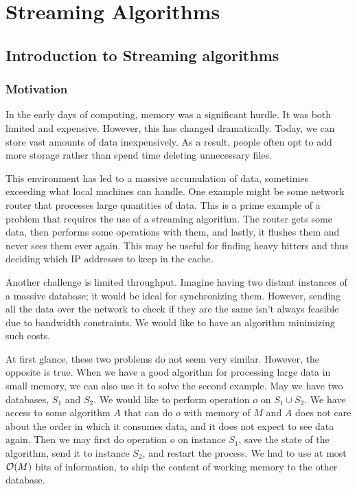 \chapter{Streaming Algorithms}

\section{Introduction to Streaming algorithms}

\subsection{Motivation}

In the early days of computing, memory was a significant hurdle. It was both limited and expensive. However, this has changed dramatically. Today, we can store vast amounts of data inexpensively. As a result, people often opt to add more storage rather than spend time deleting unnecessary files.

This environment has led to a massive accumulation of data, sometimes exceeding what local machines can handle. One example might be some network router that processes large quantities of data. This is a prime example of a problem that requires the use of a streaming algorithm. The router gets some data, then performs some operations with them, and lastly, it flushes them and never sees them ever again.  This may be useful for finding heavy hitters and thus deciding which IP addresses to keep in the cache.

Another challenge is limited throughput. Imagine having two distant instances of a massive database; it would be ideal for synchronizing them. However, sending all the data over the network to check if they are the same isn't always feasible due to bandwidth constraints. We would like to have an algorithm minimizing such costs. 

At first glance, these two problems do not seem very similar. However, the opposite is true. When we have a good algorithm for processing large data in small memory, we can also use it to solve the second example. 
May we have two databases, $S_1$ and $S_2$. We would like to perform operation $o$ on $S_1 \cup S_2$. We have access to some algorithm $A$ that can do $o$ with memory of $M$ and $A$ does not care about the order in which it consumes data, and it does not expect to see data again. Then we may first do operation $o$ on instance $S_1$, save the state of the algorithm, send it to instance $S_2$, and restart the process. We had to use at most $\mathcal{O}(M)$ bits of information, to ship the content of working memory to the other database.

